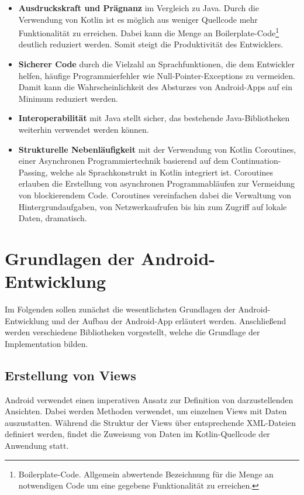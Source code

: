 \begin{itemize}
    \item \textbf{Ausdruckskraft und Prägnanz} im Vergleich zu Java. Durch die Verwendung von Kotlin ist es möglich aus weniger Quellcode mehr Funktionalität zu erreichen. Dabei kann die Menge an Boilerplate-Code\footnote{Boilerplate-Code. Allgemein abwertende Bezeichnung für die Menge an notwendigen Code um eine gegebene Funktionalität zu erreichen.} deutlich reduziert werden. Somit steigt die Produktivität des Entwicklers.
    \item \textbf{Sicherer Code} durch die Vielzahl an Sprachfunktionen, die dem Entwickler helfen, häufige Programmierfehler wie Null-Pointer-Exceptions zu vermeiden. Damit kann die Wahrscheinlichkeit des Absturzes von Android-Apps auf ein Minimum reduziert werden. \newpage
    \item \textbf{Interoperabilität} mit Java stellt sicher, das bestehende Java-Bibliotheken weiterhin verwendet werden können.
    \item \textbf{Strukturelle Nebenläufigkeit} mit der Verwendung von Kotlin Coroutines, einer Asynchronen Programmiertechnik basierend auf dem Continuation-Passing, welche als Sprachkonstrukt in Kotlin integriert ist. Coroutines erlauben die Erstellung von asynchronen Programmabläufen zur Vermeidung von blockierendem Code. Coroutines vereinfachen dabei die Verwaltung von Hintergrundaufgaben, von Netzwerkaufrufen bis hin zum Zugriff auf lokale Daten, dramatisch.    
  \end{itemize}

\section{Grundlagen der Android-Entwicklung}

Im Folgenden sollen zunächst die wesentlichsten Grundlagen der Android-Entwicklung und der Aufbau der Android-App erläutert werden. Anschließend werden verschiedene Bibliotheken vorgestellt, welche die Grundlage der Implementation bilden.

\subsection{Erstellung von Views}

Android verwendet einen imperativen Ansatz zur Definition von darzustellenden Ansichten. Dabei werden Methoden verwendet, um einzelnen Views mit Daten auszustatten. Während die Struktur der Views über entsprechende XML-Dateien definiert werden, findet die Zuweisung von Daten im Kotlin-Quellcode der Anwendung statt.

